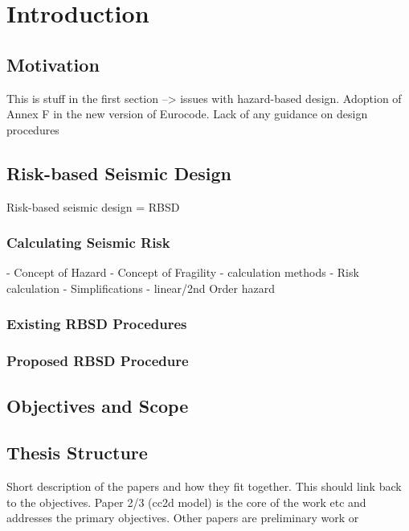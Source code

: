 \chapter{Introduction}
\label{ch:intro}

\section{Motivation}
This is stuff in the first section --> issues with hazard-based design. Adoption of Annex F in the new version of Eurocode. Lack of any guidance on design procedures

\section{Risk-based Seismic Design}
Risk-based seismic design = RBSD

\subsection{Calculating Seismic Risk}
- Concept of Hazard
- Concept of Fragility - calculation methods
- Risk calculation
- Simplifications - linear/2nd Order hazard

\subsection{Existing RBSD Procedures}

\subsection{Proposed RBSD Procedure}

\section{Objectives and Scope}

\section{Thesis Structure}
Short description of the papers and how they fit together.
This should link back to the objectives. Paper 2/3 (cc2d model) is the core of the work etc and addresses the primary objectives. Other papers are preliminary work or 